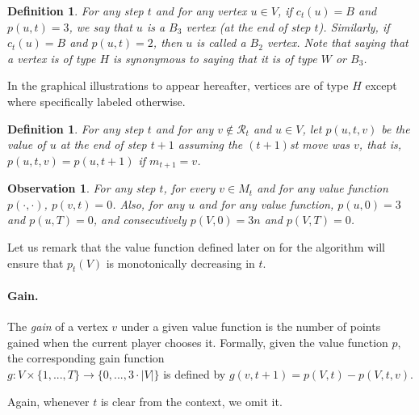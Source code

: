 \documentclass[11pt]{article}
\newtheorem{definition}[theorem]{Definition}
\newtheorem{observation}[theorem]{Observation}
\theoremstyle{definition}
\begin{document}
\begin{definition}
For any step $t$ and for any vertex $u \in V$, if $c_t(u)=B$ and $p(u, t)=3$, we say that $u$ is a $B_3$ vertex (at the end of step $t$).
Similarly, if $c_t(u)=B$ and $p(u, t)=2$, then $u$ is called a $B_2$ vertex.
Note that saying that a vertex is of type $H$ is synonymous to saying that it is of type $W$ or $B_3$.
\end{definition}

In the graphical illustrations to appear hereafter, vertices are of type $H$ except where specifically labeled otherwise.

\begin{definition}
For any step $t$ and for any $v \notin \mathcal{R}_t$ and $u \in V$,
let $p(u, t, v)$ be the value of $u$ at the end of step $t+1$ assuming the $(t+1)$st move was $v$,
that is, $p(u, t, v) = p(u, t+1)$ if $m_{t+1} = v$.

\end{definition}

\begin{observation}
For any step $t$, for every $v \in M_t$ and for any value function $p(\cdot, \cdot)$, ${p(v, t) = 0}$.
Also, for any $u$ and for any value function, $p(u, 0) = 3$ and $p(u, T) = 0$, and consecutively ${p(V, 0) = 3n}$ and $p(V, T) = 0$.
\end{observation}

Let us remark that the value function defined later on for the algorithm will ensure that $p_t(V)$ is monotonically decreasing in $t$.

\paragraph{Gain.}
The \emph{gain} of a vertex $v$ under a given value function is the number of points gained when the current player chooses it. Formally, 
given the value function $p$, the corresponding gain function \\
${g : V \times \{1, ..., T\} \rightarrow \{0, ..., 3 \cdot |V|\}}$ is defined by
$g(v, t + 1) = p(V, t) - p(V, t, v)$.

Again, whenever $t$ is clear from the context, we omit it.
\end{document}
